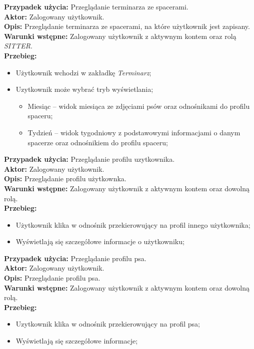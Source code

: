 \noindent
\textbf{Przypadek użycia:} Przeglądanie terminarza ze spacerami. \\
\textbf{Aktor:} Zalogowany użytkownik. \\
\textbf{Opis:} Przeglądanie terminarza ze spacerami, na które użytkownik jest zapisany. \\
\textbf{Warunki wstępne:} Zalogowany użytkownik z aktywnym kontem oraz rolą \textit{SITTER}. \\
\textbf{Przebieg:}
\begin{itemize}
    \item Użytkownik wchodzi w zakładkę \textit{Terminarz};
    \item Uzytkownik może wybrać tryb wyświetlania;
    \begin{itemize}
        \item Miesiąc -- widok miesiąca ze zdjęciami psów oraz odnośnikami do profilu spaceru;
        \item Tydzień -- widok tygodniowy z podstawowymi informacjami o danym spacerze oraz odnośnikiem do profilu spaceru;
    \end{itemize}
\end{itemize}

\noindent
\textbf{Przypadek użycia:} Przeglądanie profilu uzytkownika. \\
\textbf{Aktor:} Zalogowany użytkownik. \\
\textbf{Opis:} Przeglądanie profilu użytkownka. \\
\textbf{Warunki wstępne:} Zalogowany użytkownik z aktywnym kontem oraz dowolną rolą. \\
\textbf{Przebieg:}
\begin{itemize}
    \item Użytkownik klika w odnośnik przekierowujący na profil innego użytkownika;
    \item Wyświetlają się szczegółowe informacje o użytkowniku;
\end{itemize}

\noindent
\textbf{Przypadek użycia:} Przeglądanie profilu psa. \\
\textbf{Aktor:} Zalogowany użytkownik. \\
\textbf{Opis:} Przeglądanie profilu psa. \\
\textbf{Warunki wstępne:} Zalogowany użytkownik z aktywnym kontem oraz dowolną rolą. \\
\textbf{Przebieg:}
\begin{itemize}
    \item Uzytkownik klika w odnośnik przekierowujący na profil psa;
    \item Wyświetlają się szczegółowe informacje;
\end{itemize}

